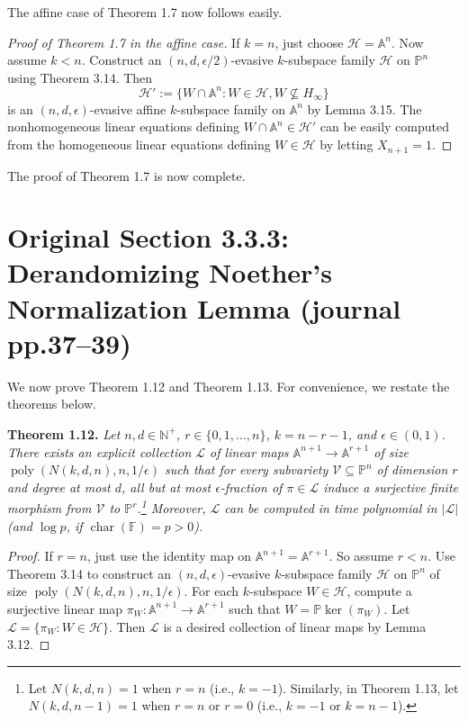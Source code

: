\documentclass[10pt,a4paper]{article}
\newcommand{\FF}{\mathbb F}
\newcommand{\PP}{\mathbb P}
\newcommand{\Aspace}{\mathbb A}
\newenvironment{result}[1]{\par\medskip\noindent\textbf{#1.}\itshape}{\par\medskip}
\begin{document}
The affine case of Theorem 1.7 now follows easily.
\begin{proof}[Proof of Theorem 1.7 in the affine case]
If $k=n$, just choose $\mathcal H=\Aspace^n$. Now assume $k<n$. Construct an $(n,d,\epsilon/2)$-evasive $k$-subspace family $\mathcal H$ on $\PP^n$ using Theorem 3.14. Then
\[\mathcal H':=\{W\cap\Aspace^n:W\in\mathcal H,W\not\subseteq H_\infty\}\]
is an $(n,d,\epsilon)$-evasive affine $k$-subspace family on $\Aspace^n$ by Lemma 3.15. The nonhomogeneous linear equations defining $W\cap\Aspace^n\in\mathcal H'$ can be easily computed from the homogeneous linear equations defining $W\in\mathcal H$ by letting $X_{n+1}=1$.
\end{proof}
The proof of Theorem 1.7 is now complete.

\section*{Original Section 3.3.3: Derandomizing Noether's Normalization Lemma (journal pp.37--39)}
We now prove Theorem 1.12 and Theorem 1.13. For convenience, we restate the theorems below.
\begin{result}{Theorem 1.12}
Let $n,d\in\mathbb N^+$, $r\in\{0,1,\ldots,n\}$, $k=n-r-1$, and $\epsilon\in(0,1)$. There exists an explicit collection $\mathcal L$ of linear maps $\Aspace^{n+1}\to\Aspace^{r+1}$ of size $\operatorname{poly}(N(k,d,n),n,1/\epsilon)$ such that for every subvariety $\mathcal V\subseteq\PP^n$ of dimension $r$ and degree at most $d$, all but at most $\epsilon$-fraction of $\pi\in\mathcal L$ induce a surjective finite morphism from $\mathcal V$ to $\PP^r$.\footnote{Let $N(k,d,n)=1$ when $r=n$ (i.e., $k=-1$). Similarly, in Theorem 1.13, let $N(k,d,n-1)=1$ when $r=n$ or $r=0$ (i.e., $k=-1$ or $k=n-1$).} Moreover, $\mathcal L$ can be computed in time polynomial in $|\mathcal L|$ (and $\log p$, if $\operatorname{char}(\FF)=p>0$).
\end{result}
\begin{proof}
If $r=n$, just use the identity map on $\Aspace^{n+1}=\Aspace^{r+1}$. So assume $r<n$. Use Theorem 3.14 to construct an $(n,d,\epsilon)$-evasive $k$-subspace family $\mathcal H$ on $\PP^n$ of size $\operatorname{poly}(N(k,d,n),n,1/\epsilon)$. For each $k$-subspace $W\in\mathcal H$, compute a surjective linear map $\pi_W:\Aspace^{n+1}\to\Aspace^{r+1}$ such that $W=\PP\ker(\pi_W)$. Let $\mathcal L=\{\pi_W:W\in\mathcal H\}$. Then $\mathcal L$ is a desired collection of linear maps by Lemma 3.12.
\end{proof}
\end{document}
